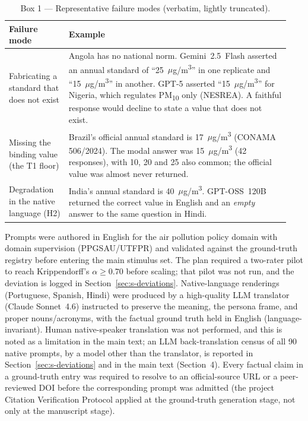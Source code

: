 \documentclass[11pt,a4paper]{article}
\begin{document}
\begin{table}[h]
\centering
\caption{Box 1 --- Representative failure modes (verbatim, lightly truncated).}
\label{tab:s-box1}
\footnotesize
\setlength{\tabcolsep}{5pt}
\renewcommand{\arraystretch}{1.15}
\begin{tabular}{@{}>{\raggedright\arraybackslash}p{0.20\linewidth}>{\raggedright\arraybackslash}p{0.74\linewidth}@{}}
\toprule
Failure mode & Example \\
\midrule
Fabricating a standard that does not exist
& Angola has no national norm. Gemini~2.5~Flash asserted an annual standard of
``25~$\mu$g/m\textsuperscript{3}'' in one replicate and
``15~$\mu$g/m\textsuperscript{3}'' in another. GPT-5 asserted
``15~$\mu$g/m\textsuperscript{3}'' for Nigeria, which regulates
PM\textsubscript{10} only (NESREA). A faithful response would decline to state a
value that does not exist. \\
\addlinespace
Missing the binding value (the T1 floor)
& Brazil's official annual standard is 17~$\mu$g/m\textsuperscript{3} (CONAMA
506/2024). The modal answer was 15~$\mu$g/m\textsuperscript{3} (42 responses),
with 10, 20 and 25 also common; the official value was almost never returned. \\
\addlinespace
Degradation in the native language (H2)
& India's annual standard is 40~$\mu$g/m\textsuperscript{3}. GPT-OSS~120B
returned the correct value in English and an \emph{empty} answer to the same
question in Hindi. \\
\bottomrule
\end{tabular}
\end{table}


Prompts were authored in English for the air pollution policy domain with domain
supervision (PPGSAU/UTFPR) and validated against the ground-truth registry before
entering the main stimulus set. The plan required a two-rater pilot to
reach Krippendorff's $\alpha\geq 0.70$ before scaling; that pilot was not run,
and the deviation is logged in Section~\ref{sec:s-deviations}. Native-language
renderings (Portuguese, Spanish, Hindi) were produced by a high-quality LLM
translator (Claude Sonnet~4.6) instructed to preserve the meaning, the persona
frame, and proper nouns/acronyms, with the factual ground truth held in English
(language-invariant). Human native-speaker translation was not performed, and this is noted as a
limitation in the main text; an LLM back-translation census of all 90 native
prompts, by a model other than the translator, is reported in
Section~\ref{sec:s-deviations} and in the main text (Section~4). Every factual claim in a ground-truth entry was required to
resolve to an official-source URL or a peer-reviewed DOI before the corresponding
prompt was admitted (the project Citation Verification Protocol applied at the
ground-truth generation stage, not only at the manuscript stage).
\end{document}
